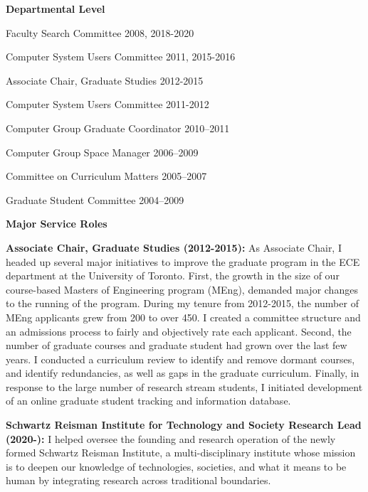 \documentclass[10pt]{article}
\newenvironment{lonelist}[1][\enskip\textbullet]%
        {\vspace{-\baselineskip}\begin{list}{#1}{%
        \setlength{\partopsep}{0pt}%
        \setlength{\topsep}{0pt}
	\setlength{\leftmargin}{0pt}}}
        {\end{list}\vspace{-.6\baselineskip}}
\newenvironment{innerenum}[1][1.]%
        {\begin{compactenum}[#1]}{\end{compactenum}}
\begin{document}
\begin{lonelist}
	\item[] {\bf Departmental Level}
	\begin{innerenum}
		\item Faculty Search Committee \hfill{2008, 2018-2020}
		\item Computer System Users Committee \hfill{2011, 2015-2016}
		\item Associate Chair, Graduate Studies \hfill{2012-2015}
		\item Computer System Users Committee \hfill{2011-2012}
		\item Computer Group Graduate Coordinator \hfill{2010--2011}
		\item Computer Group Space Manager \hfill{2006--2009}
		\item Committee on Curriculum Matters \hfill{2005--2007}
		\item Graduate Student Committee \hfill{2004--2009}
\end{innerenum}
\item[] {\bf Major Service Roles}
\begin{innerenum}
	\item[] {\bf Associate Chair, Graduate Studies (2012-2015):}  As Associate Chair, I headed up several major initiatives to improve the graduate program in the ECE department at the University of Toronto.  First, the growth in the size of our course-based Masters of Engineering program (MEng), demanded major changes to the running of the program.  During my tenure from 2012-2015, the number of MEng applicants grew from 200 to over 450.  I created a committee structure and an admissions process to fairly and objectively rate each applicant.  Second, the number of graduate courses and graduate student had grown over the last few years.  I conducted a curriculum review to identify and remove dormant courses, and identify redundancies, as well as gaps in the graduate curriculum.  Finally, in response to the large number of research stream students, I initiated development of an online graduate student tracking and information database.
	\item[] {\bf  Schwartz Reisman Institute for Technology and Society Research Lead (2020-):} I helped oversee the founding and research operation of the newly formed Schwartz Reisman Institute, a multi-disciplinary institute whose mission is to deepen our knowledge of technologies, societies, and what it means to be human by integrating research across traditional boundaries.  
\end{innerenum}
\end{lonelist}
\end{document}
